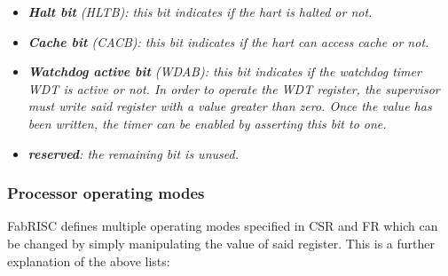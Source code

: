 \begin{itemize}
                \item \textit{\textbf{Halt bit} (HLTB): this bit indicates if the hart is halted or not.}

                \item \textit{\textbf{Cache bit} (CACB): this bit indicates if the hart can access cache or not.}

                \item \textit{\textbf{Watchdog active bit} (WDAB): this bit indicates if the watchdog timer WDT is active or not. In order to operate the WDT register, the supervisor must write said register with a value greater than zero. Once the value has been written, the timer can be enabled by asserting this bit to one.}

                \item \textit{\textbf{reserved}: the remaining bit is unused.}

            \end{itemize}

        \subsubsection{Processor operating modes}

            \vspace{10pt}

            FabRISC defines multiple operating modes specified in CSR and FR which can be changed by simply manipulating the value of said register. This is a further explanation of the above lists:

